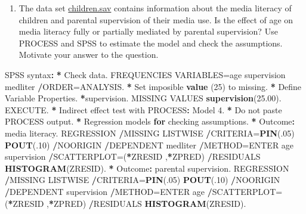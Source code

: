 \documentclass[a4paper]{book}
\newenvironment{Shaded}{\begin{snugshade}}{\end{snugshade}}
\newcommand{\KeywordTok}[1]{\textcolor[rgb]{0,0,0}{\textbf{#1}}}
\newcommand{\DecValTok}[1]{\textcolor[rgb]{0.00,0.00,0.00}{#1}}
\newcommand{\FloatTok}[1]{\textcolor[rgb]{0.00,0.00,0.00}{#1}}
\newcommand{\StringTok}[1]{\textcolor[rgb]{0.00,0.00,0.00}{#1}}
\newcommand{\ControlFlowTok}[1]{\textcolor[rgb]{0.00,0.00,0.00}{\textbf{#1}}}
\newcommand{\OperatorTok}[1]{\textcolor[rgb]{0.00,0.00,0.00}{\textbf{#1}}}
\newcommand{\ErrorTok}[1]{\textcolor[rgb]{0.00,0.00,0.00}{\textbf{#1}}}
\newcommand{\NormalTok}[1]{#1}
\providecommand{\tightlist}{%
  \setlength{\itemsep}{0pt}\setlength{\parskip}{0pt}}
\theoremstyle{definition}
\theoremstyle{definition}
\theoremstyle{definition}
\theoremstyle{remark}
\begin{document}
\begin{enumerate}
\def\labelenumi{\arabic{enumi}.}
\setcounter{enumi}{4}
\tightlist
\item
  The data set
  \href{http://82.196.4.233:3838/data/children.sav}{children.sav}
  contains information about the media literacy of children and parental
  supervision of their media use. Is the effect of age on media literacy
  fully or partially mediated by parental supervision? Use PROCESS and
  SPSS to estimate the model and check the assumptions. Motivate your
  answer to the question.
\end{enumerate}

\begin{Shaded}
\begin{Highlighting}[]
\NormalTok{SPSS syntax}\OperatorTok{:}\StringTok{  }
\StringTok{  }
\ErrorTok{*}\StringTok{ }\NormalTok{Check data.    }
\NormalTok{FREQUENCIES VARIABLES=age supervision medliter    }
  \OperatorTok{/}\NormalTok{ORDER=ANALYSIS.    }
\OperatorTok{*}\StringTok{ }\NormalTok{Set imposible }\KeywordTok{value}\NormalTok{ (}\DecValTok{25}\NormalTok{) to missing.    }
\OperatorTok{*}\StringTok{ }\NormalTok{Define Variable Properties.    }
\OperatorTok{*}\NormalTok{supervision.    }
\NormalTok{MISSING VALUES }\KeywordTok{supervision}\NormalTok{(}\FloatTok{25.00}\NormalTok{).    }
\NormalTok{EXECUTE.    }
\OperatorTok{*}\StringTok{ }\NormalTok{Indirect effect test with PROCESS}\OperatorTok{:}\StringTok{ }\NormalTok{Model }\DecValTok{4}\NormalTok{.    }
\OperatorTok{*}\StringTok{ }\NormalTok{Do not paste PROCESS output.    }
\OperatorTok{*}\StringTok{ }\NormalTok{Regression models }\ControlFlowTok{for}\NormalTok{ checking assumptions.    }
\OperatorTok{*}\StringTok{ }\NormalTok{Outcome}\OperatorTok{:}\StringTok{ }\NormalTok{media literacy.    }
\NormalTok{REGRESSION    }
  \OperatorTok{/}\NormalTok{MISSING LISTWISE    }
  \OperatorTok{/}\NormalTok{CRITERIA=}\KeywordTok{PIN}\NormalTok{(.}\DecValTok{05}\NormalTok{) }\KeywordTok{POUT}\NormalTok{(.}\DecValTok{10}\NormalTok{)    }
  \OperatorTok{/}\NormalTok{NOORIGIN     }
  \OperatorTok{/}\NormalTok{DEPENDENT medliter    }
  \OperatorTok{/}\NormalTok{METHOD=ENTER age supervision    }
  \OperatorTok{/}\NormalTok{SCATTERPLOT=(}\OperatorTok{*}\NormalTok{ZRESID ,}\OperatorTok{*}\NormalTok{ZPRED)    }
  \OperatorTok{/}\NormalTok{RESIDUALS }\KeywordTok{HISTOGRAM}\NormalTok{(ZRESID).    }
\OperatorTok{*}\StringTok{ }\NormalTok{Outcome}\OperatorTok{:}\StringTok{ }\NormalTok{parental supervision.    }
\NormalTok{REGRESSION    }
  \OperatorTok{/}\NormalTok{MISSING LISTWISE    }
  \OperatorTok{/}\NormalTok{CRITERIA=}\KeywordTok{PIN}\NormalTok{(.}\DecValTok{05}\NormalTok{) }\KeywordTok{POUT}\NormalTok{(.}\DecValTok{10}\NormalTok{)    }
  \OperatorTok{/}\NormalTok{NOORIGIN     }
  \OperatorTok{/}\NormalTok{DEPENDENT supervision    }
  \OperatorTok{/}\NormalTok{METHOD=ENTER age    }
  \OperatorTok{/}\NormalTok{SCATTERPLOT=(}\OperatorTok{*}\NormalTok{ZRESID ,}\OperatorTok{*}\NormalTok{ZPRED)    }
  \OperatorTok{/}\NormalTok{RESIDUALS }\KeywordTok{HISTOGRAM}\NormalTok{(ZRESID).    }
  

\end{Highlighting}
\end{Shaded}
\end{document}
